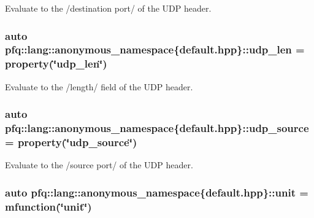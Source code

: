 Evaluate to the /destination port/ of the U\+D\+P header. 

\hypertarget{namespacepfq_1_1lang_1_1anonymous__namespace_02default_8hpp_03_ac7f1ef80a8ec46ce01aa12f66cfee86b}{
\subsubsection[{udp\+\_\+len}]{\setlength{\rightskip}{0pt plus 5cm}auto pfq\+::lang\+::anonymous\+\_\+namespace\{default.\+hpp\}\+::udp\+\_\+len = {\bf property}(\char`\"{}udp\+\_\+len\char`\"{})}}\label{namespacepfq_1_1lang_1_1anonymous__namespace_02default_8hpp_03_ac7f1ef80a8ec46ce01aa12f66cfee86b}


Evaluate to the /length/ field of the U\+D\+P header. 

\hypertarget{namespacepfq_1_1lang_1_1anonymous__namespace_02default_8hpp_03_ab44590359ef60febe9bfc6465bcf932a}{
\subsubsection[{udp\+\_\+source}]{\setlength{\rightskip}{0pt plus 5cm}auto pfq\+::lang\+::anonymous\+\_\+namespace\{default.\+hpp\}\+::udp\+\_\+source = {\bf property}(\char`\"{}udp\+\_\+source\char`\"{})}}\label{namespacepfq_1_1lang_1_1anonymous__namespace_02default_8hpp_03_ab44590359ef60febe9bfc6465bcf932a}


Evaluate to the /source port/ of the U\+D\+P header. 

\hypertarget{namespacepfq_1_1lang_1_1anonymous__namespace_02default_8hpp_03_a85f9b2d401cbb1d135679160de0e97de}{
\subsubsection[{unit}]{\setlength{\rightskip}{0pt plus 5cm}auto pfq\+::lang\+::anonymous\+\_\+namespace\{default.\+hpp\}\+::unit = {\bf mfunction}(\char`\"{}unit\char`\"{})}}\label{namespacepfq_1_1lang_1_1anonymous__namespace_02default_8hpp_03_a85f9b2d401cbb1d135679160de0e97de}


